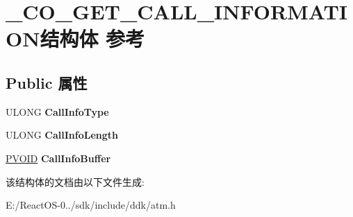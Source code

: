 \hypertarget{struct___c_o___g_e_t___c_a_l_l___i_n_f_o_r_m_a_t_i_o_n}{}\section{\+\_\+\+C\+O\+\_\+\+G\+E\+T\+\_\+\+C\+A\+L\+L\+\_\+\+I\+N\+F\+O\+R\+M\+A\+T\+I\+O\+N结构体 参考}
\label{struct___c_o___g_e_t___c_a_l_l___i_n_f_o_r_m_a_t_i_o_n}
\subsection*{Public 属性}
\begin{DoxyCompactItemize}
\item 
\mbox{\label{struct___c_o___g_e_t___c_a_l_l___i_n_f_o_r_m_a_t_i_o_n_a79630c28e2b6e2331a582715f336add5}} 
U\+L\+O\+NG {\bfseries Call\+Info\+Type}
\item 
\mbox{\label{struct___c_o___g_e_t___c_a_l_l___i_n_f_o_r_m_a_t_i_o_n_a9960a71bff549c79866d07c29eddbf83}} 
U\+L\+O\+NG {\bfseries Call\+Info\+Length}
\item 
\mbox{\label{struct___c_o___g_e_t___c_a_l_l___i_n_f_o_r_m_a_t_i_o_n_a28504ab6f84641cfce09df884de7a9a3}} 
\hyperlink{interfacevoid}{P\+V\+O\+ID} {\bfseries Call\+Info\+Buffer}
\end{DoxyCompactItemize}


该结构体的文档由以下文件生成\+:\begin{DoxyCompactItemize}
\item 
E\+:/\+React\+O\+S-\/0../sdk/include/ddk/atm.\+h\end{DoxyCompactItemize}
